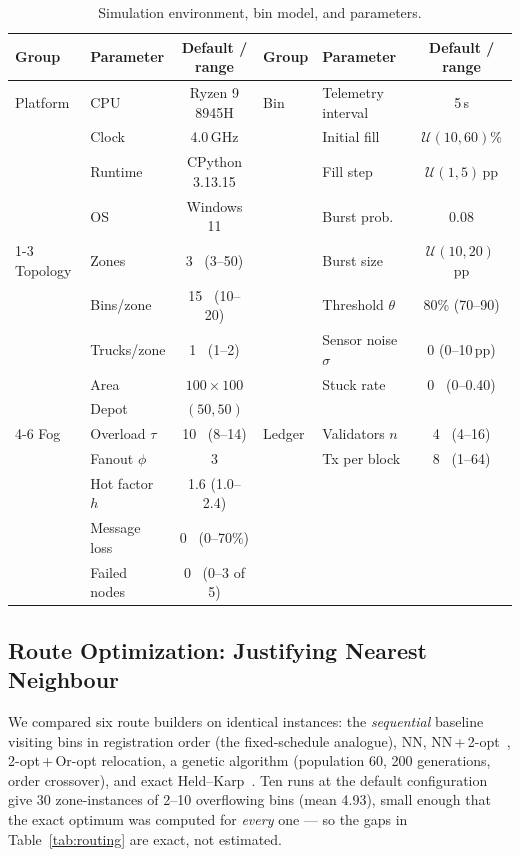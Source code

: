 \documentclass{llncs}
\begin{document}
\begin{table}[htbp]
\centering
\caption{Simulation environment, bin model, and parameters.}
\label{tab:config}
\footnotesize
\renewcommand{\arraystretch}{1.05}
\setlength{\tabcolsep}{3.5pt}
\begin{tabular}{llc@{\hspace{10pt}}llc}
\toprule
\textbf{Group} & \textbf{Parameter} & \textbf{Default / range} &
\textbf{Group} & \textbf{Parameter} & \textbf{Default / range}\\
\midrule
Platform & CPU        & Ryzen 9 8945H   & Bin & Telemetry interval & 5\,s \\
         & Clock      & 4.0\,GHz        &     & Initial fill  & $\mathcal{U}(10,60)\%$ \\
         & Runtime    & CPython 3.13.15 &     & Fill step     & $\mathcal{U}(1,5)$\,pp \\
         & OS         & Windows 11      &     & Burst prob.   & 0.08 \\
\cmidrule(r){1-3}
Topology & Zones      & 3 \ (3--50)     &     & Burst size    & $\mathcal{U}(10,20)$\,pp \\
         & Bins/zone  & 15 \ (10--20)   &     & Threshold $\theta$ & 80\% (70--90) \\
         & Trucks/zone& 1 \ (1--2)      &     & Sensor noise $\sigma$ & 0 (0--10\,pp) \\
         & Area       & $100\times100$  &     & Stuck rate    & 0 \ (0--0.40) \\
         & Depot      & $(50,50)$       &     &               &  \\
\cmidrule(r){4-6}
Fog      & Overload $\tau$ & 10 \ (8--14) & Ledger & Validators $n$ & 4 \ (4--16) \\
         & Fanout $\phi$   & 3            &        & Tx per block   & 8 \ (1--64) \\
         & Hot factor $h$  & 1.6 (1.0--2.4)&       &                &  \\
         & Message loss    & 0 \ (0--70\%)&        &                &  \\
         & Failed nodes    & 0 \ (0--3 of 5)&      &                &  \\
\bottomrule
\end{tabular}
\end{table}

\subsection{Route Optimization: Justifying Nearest Neighbour}
\label{sec:routing}
We compared six route builders on identical instances: the \emph{sequential}
baseline visiting bins in registration order (the fixed-schedule analogue), NN,
NN\,+\,2-opt~\cite{croes}, 2-opt\,+\,Or-opt relocation, a genetic algorithm
(population 60, 200 generations, order crossover), and exact
Held--Karp~\cite{heldkarp}. Ten runs at the default configuration give 30
zone-instances of 2--10 overflowing bins (mean 4.93), small enough that the
exact optimum was computed for \emph{every} one --- so the gaps in
Table~\ref{tab:routing} are exact, not estimated.
\end{document}
